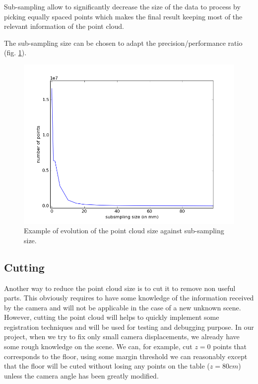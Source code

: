 Sub-sampling allow to significantly decrease the size of the data to process by picking equally spaced points which makes the final result keeping most of the relevant information of the point cloud.

The sub-sampling size can be chosen to adapt the precision/performance ratio (fig. \ref{fig:sub_size}).

\begin{figure}[h!]
\centering
\includegraphics[width=\textwidth]{images/subsampling_size.png}
\caption{Example of evolution of the point cloud size against sub-sampling size.}
\label{fig:sub_size}
\end{figure}

\subsection{Cutting}

Another way to reduce the point cloud size is to cut it to remove non useful parts. This obviously requires to have some knowledge of the information received by the camera and will not be applicable in the case of a new unknown scene. However, cutting the point cloud will helps to quickly implement some registration techniques and will be used for testing and debugging purpose. In our project, when we try to fix only small camera displacements, we already have some rough knowledge on the scene. We can, for example, cut $z=0$ points that corresponds to the floor, using some margin threshold we can reasonably except that the floor will be cuted without losing any points on the table ($z=80cm$) unless the camera angle has been greatly modified.

